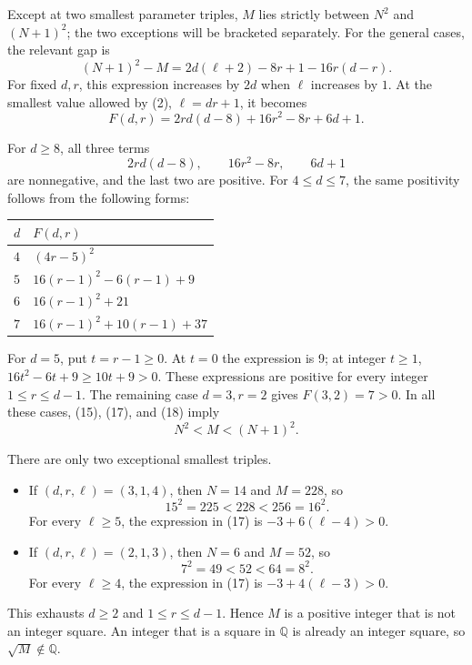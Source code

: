 \documentclass[11pt]{article}
\begin{document}
Except at two smallest parameter triples, \(M\) lies strictly between
\(N^2\) and \((N+1)^2\); the two exceptions will be bracketed separately.
For the general cases, the relevant gap is
\[
 (N+1)^2-M
   =2d(\ell+2)-8r+1-16r(d-r). \tag{17}
\]
For fixed \(d,r\), this expression increases by \(2d\) when \(\ell\)
increases by \(1\). At the smallest value allowed by (2),
\(\ell=dr+1\), it becomes
\[
 F(d,r)=2rd(d-8)+16r^2-8r+6d+1. \tag{18}
\]

For \(d\geq8\), all three terms
\[
 2rd(d-8),\qquad 16r^2-8r,\qquad 6d+1
\]
are nonnegative, and the last two are positive. For \(4\leq d\leq7\), the
same positivity follows from the following forms:

\begin{center}
\begin{tabular}{ll}
\toprule
\(d\) & \(F(d,r)\) \\
\midrule
\(4\) & \((4r-5)^2\) \\
\(5\) & \(16(r-1)^2-6(r-1)+9\) \\
\(6\) & \(16(r-1)^2+21\) \\
\(7\) & \(16(r-1)^2+10(r-1)+37\) \\
\bottomrule
\end{tabular}
\end{center}

For \(d=5\), put \(t=r-1\geq0\). At \(t=0\) the expression is 9; at integer \(t\geq1\), \(16t^2-6t+9\geq10t+9>0\). These expressions are positive for every integer \(1\leq r\leq d-1\).
The remaining case \(d=3,r=2\) gives \(F(3,2)=7>0\). In all these cases,
(15), (17), and (18) imply
\[
 N^2<M<(N+1)^2. \tag{19}
\]

There are only two exceptional smallest triples.

\begin{itemize}
\item If \((d,r,\ell)=(3,1,4)\), then \(N=14\) and \(M=228\), so
  \[
  15^2=225<228<256=16^2.
  \]
  For every \(\ell\geq5\), the expression in (17) is \(-3+6(\ell-4)>0\).
\item If \((d,r,\ell)=(2,1,3)\), then \(N=6\) and \(M=52\), so
  \[
  7^2=49<52<64=8^2.
  \]
  For every \(\ell\geq4\), the expression in (17) is \(-3+4(\ell-3)>0\).

\end{itemize}
This exhausts \(d\geq2\) and \(1\leq r\leq d-1\). Hence \(M\) is a positive
integer that is not an integer square. An integer that is a square in
\(\mathbb Q\) is already an integer square, so \(\sqrt M\notin\mathbb Q\).
\end{document}
